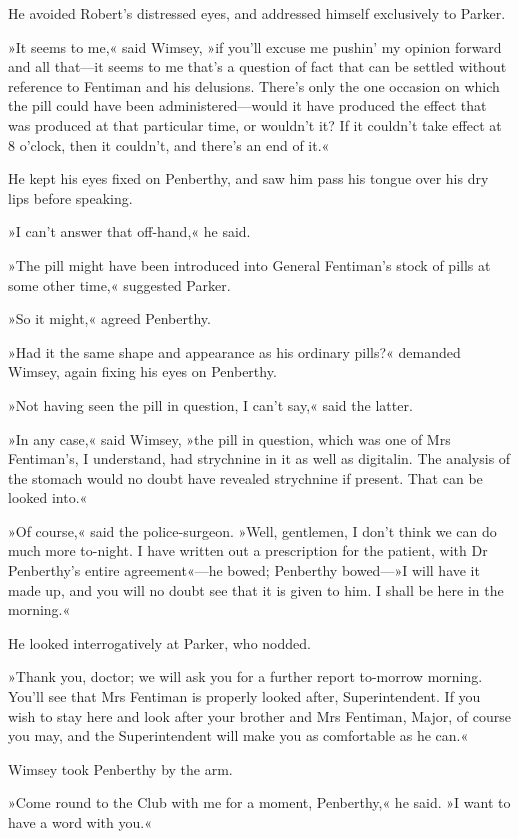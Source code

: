 He avoided Robert's distressed eyes, and addressed himself exclusively to Parker.

»It seems to me,« said Wimsey, »if you'll excuse me pushin' my opinion forward and all that—it seems to me that's a question of fact that can be settled without reference to Fentiman and his delusions. There's only the one occasion on which the pill could have been administered—would it have produced the effect that was produced at that particular time, or wouldn't it? If it couldn't take effect at 8 o'clock, then it couldn't, and there's an end of it.«

He kept his eyes fixed on Penberthy, and saw him pass his tongue over his dry lips before speaking.

»I can't answer that off-hand,« he said.

»The pill might have been introduced into General Fentiman's stock of pills at some other time,« suggested Parker.

»So it might,« agreed Penberthy.

»Had it the same shape and appearance as his ordinary pills?« demanded Wimsey, again fixing his eyes on Penberthy.

»Not having seen the pill in question, I can't say,« said the latter.

»In any case,« said Wimsey, »the pill in question, which was one of Mrs Fentiman's, I understand, had strychnine in it as well as digitalin. The analysis of the stomach would no doubt have revealed strychnine if present. That can be looked into.«

»Of course,« said the police-surgeon. »Well, gentlemen, I don't think we can do much more to-night. I have written out a prescription for the patient, with Dr Penberthy's entire agreement«—he bowed; Penberthy bowed—»I will have it made up, and you will no doubt see that it is given to him. I shall be here in the morning.«

He looked interrogatively at Parker, who nodded.

»Thank you, doctor; we will ask you for a further report to-morrow morning. You'll see that Mrs Fentiman is properly looked after, Superintendent. If you wish to stay here and look after your brother and Mrs Fentiman, Major, of course you may, and the Superintendent will make you as comfortable as he can.«

Wimsey took Penberthy by the arm.

»Come round to the Club with me for a moment, Penberthy,« he said. »I want to have a word with you.«